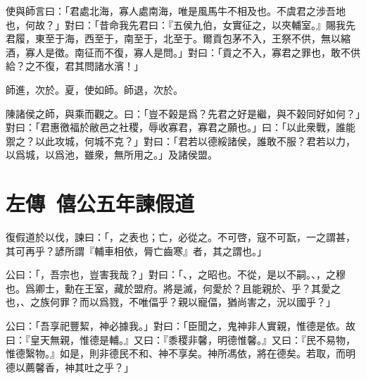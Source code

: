 使與師言曰：「君處北海，寡人處南海，唯是風馬牛不相及也。不虞君之涉吾地也，何故？」對曰：「昔命我先君曰：『五侯九伯，女實征之，以夾輔室。』賜我先君履，東至于海，西至于，南至于，北至于。爾貢包茅不入，王祭不供，無以縮酒，寡人是徵。南征而不復，寡人是問。」對曰：「貢之不入，寡君之罪也，敢不供給？之不復，君其問諸水濱！」

師進，次於。夏，使如師。師退，次於。

陳諸侯之師，與乘而觀之。曰：「豈不榖是爲？先君之好是繼，與不榖同好如何？」對曰：「君惠徼福於敝邑之社稷，辱收寡君，寡君之願也。」曰：「以此衆戰，誰能禦之？以此攻城，何城不克？」對曰：「君若以德綏諸侯，誰敢不服？君若以力，以爲城，以爲池，雖衆，無所用之。」及諸侯盟。

\section[宮之奇諫假道\quad{\small 左傳\ 僖公五年}]{{\normalsize 左傳\ 僖公五年}\quad {}諫假道}
復假道於以伐，諫曰：「，之表也；亡，必從之。不可啓，寇不可翫，一之謂甚，其可再乎？諺所謂『輔車相依，脣亡齒寒』者，其之謂也。」

公曰：「，吾宗也，豈害我哉？」對曰：「、，之昭也。不從，是以不嗣。、，之穆也。爲卿士，勳在王室，藏於盟府。將是滅，何愛於？且能親於、乎？其愛之也，、之族何罪？而以爲戮，不唯偪乎？親以寵偪，猶尚害之，況以國乎？」

公曰：「吾享祀豐{絜}，神必據我。」對曰：「臣聞之，鬼神非人實親，惟德是依。故曰：『皇天無親，惟德是輔。』又曰：『黍稷非馨，明德惟馨。』又曰：『民不易物，惟德繄物。』如是，則非德民不和、神不享矣。神所馮依，將在德矣。若取，而明德以薦馨香，神其吐之乎？」

